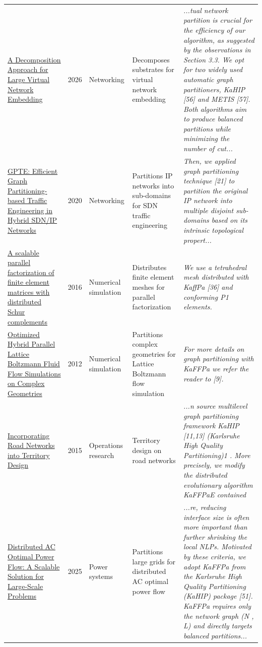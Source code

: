 \documentclass[9pt]{extarticle}
\begin{document}
\begin{longtable}{@{}>{\raggedright}p{6.6cm}r>{\raggedright}p{2.9cm}>{\raggedright}p{4.6cm}>{\raggedright\arraybackslash}p{8.4cm}@{}}
\href{https://doi.org/10.1002/net.70062}{A Decomposition Approach for Large Virtual Network Embedding} & 2026 & Networking & Decomposes substrates for virtual network embedding & {\footnotesize\itshape ...tual network partition is crucial for the efficiency of our algorithm, as suggested by the observations in Section 3.3. We opt for two widely used automatic graph partitioners, KaHIP [56] and METIS [57]. Both algorithms aim to produce balanced partitions while minimizing the number of cut...}\\
\href{https://doi.org/10.1109/HPCC-SmartCity-DSS50907.2020.00128}{GPTE: Efficient Graph Partitioning-based Traffic Engineering in Hybrid SDN/IP Networks} & 2020 & Networking & Partitions IP networks into sub-domains for SDN traffic engineering & {\footnotesize\itshape Then, we applied graph partitioning technique [21] to partition the original IP network into multiple disjoint sub-domains based on its intrinsic topological propert...}\\
\href{https://doi.org/10.1002/nla.2057}{A scalable parallel factorization of finite element matrices with distributed Schur complements} & 2016 & Numerical simulation & Distributes finite element meshes for parallel factorization & {\footnotesize\itshape We use a tetrahedral mesh distributed with KaffPa [36] and conforming P1 elements.}\\
\href{https://doi.org/10.1007/978-3-642-32820-6_81}{Optimized Hybrid Parallel Lattice Boltzmann Fluid Flow Simulations on Complex Geometries} & 2012 & Numerical simulation & Partitions complex geometries for Lattice Boltzmann flow simulation & {\footnotesize\itshape For more details on graph partitioning with KaFFPa we refer the reader to [9].}\\
\href{https://doi.org/10.48550/arxiv.1504.07846}{Incorporating Road Networks into Territory Design} & 2015 & Operations research & Territory design on road networks & {\footnotesize\itshape ...n source multilevel graph partitioning framework KaHIP [11,13] (Karlsruhe High Quality Partitioning)1 . More precisely, we modify the distributed evolutionary algorithm KaFFPaE contained}\\
\href{https://doi.org/10.48550/arxiv.2503.24086}{Distributed AC Optimal Power Flow: A Scalable Solution for Large-Scale Problems} & 2025 & Power systems & Partitions large grids for distributed AC optimal power flow & {\footnotesize\itshape ...re, reducing interface size is often more important than further shrinking the local NLPs. Motivated by these criteria, we adopt KaFFPa from the Karlsruhe High Quality Partitioning (KaHIP) package [51]. KaFFPa requires only the network graph (N , L) and directly targets balanced partitions...}\\

\end{longtable}
\end{document}

